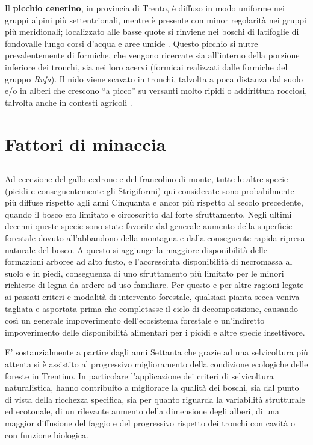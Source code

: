 \documentclass[10pt,twoside,openany,x11names,svgnames,italian,a5paper,dvipsnames,table]{memoir}
\newcommand\chapterillustration{}
\begin{document}
Il \textbf{picchio cenerino}, in provincia di Trento, è diffuso in modo uniforme nei gruppi alpini più settentrionali, mentre è presente con minor regolarità nei gruppi più meridionali; localizzato alle basse quote si rinviene nei boschi di latifoglie di fondovalle lungo corsi d’acqua e aree umide \cite{Pedrini05}. Questo picchio si nutre prevalentemente di formiche, che vengono ricercate sia all’interno della porzione inferiore dei tronchi, sia nei loro acervi (formicai realizzati dalle formiche del gruppo \emph{Rufa}). Il nido viene scavato in tronchi, talvolta a poca distanza dal suolo e/o in alberi che crescono “a picco” su versanti molto ripidi o addirittura rocciosi, talvolta anche in contesti agricoli \cite{Cramp98}.



 
\chapter{Fattori di minaccia} 
\renewcommand\chapterillustration{3.JPG}
\section*{}

Ad eccezione del gallo cedrone e del francolino di monte, tutte le altre specie (picidi e conseguentemente gli Strigiformi) qui considerate sono probabilmente più diffuse rispetto agli anni Cinquanta e ancor più rispetto al secolo precedente, quando il bosco era limitato e circoscritto dal forte sfruttamento. Negli ultimi decenni queste specie sono state favorite dal generale aumento della superficie forestale dovuto all’abbandono della montagna e dalla conseguente rapida ripresa naturale del bosco. A questo si aggiunge la maggiore disponibilità delle formazioni arboree ad alto fusto, e  l’accresciuta disponibilità di necromassa al suolo e in piedi, conseguenza di uno sfruttamento più limitato per le minori richieste di legna da ardere ad uso familiare. Per questo e per altre ragioni legate ai passati criteri e modalità di intervento forestale, qualsiasi pianta secca veniva tagliata e asportata prima che completasse il ciclo di decomposizione, causando così un generale impoverimento dell’ecosistema forestale e un’indiretto impoverimento delle disponibilità alimentari per i picidi e altre specie insettivore. 

E’ sostanzialmente a partire dagli anni Settanta che grazie ad una selvicoltura più attenta si è assistito al progressivo miglioramento della condizione ecologiche delle foreste in Trentino. In particolare l’applicazione dei criteri di selvicoltura naturalistica, hanno contribuito a migliorare la qualità dei boschi, sia dal punto di vista della ricchezza specifica, sia per quanto riguarda la variabilità strutturale ed ecotonale, di un rilevante aumento della dimensione degli alberi, di una maggior diffusione del faggio e del progressivo rispetto dei tronchi con cavità o con funzione biologica. 
\end{document}
